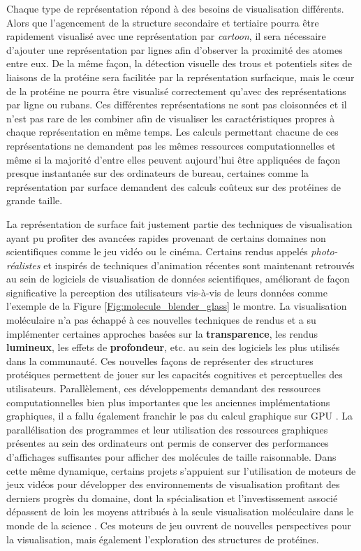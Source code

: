 Chaque type de représentation répond à des besoins de visualisation différents. Alors que l'agencement de la structure secondaire et tertiaire pourra être rapidement visualisé avec une représentation par \textit{cartoon}, il sera nécessaire d'ajouter une représentation par lignes afin d'observer la proximité des atomes entre eux. De la même façon, la détection visuelle des trous et potentiels sites de liaisons de la protéine sera facilitée par la représentation surfacique, mais le cœur de la protéine ne pourra être visualisé correctement qu'avec des représentations par ligne ou rubans. Ces différentes représentations ne sont pas cloisonnées et il n'est pas rare de les combiner afin de visualiser les caractéristiques propres à chaque représentation en même temps. Les calculs permettant chacune de ces représentations ne demandent pas les mêmes ressources computationnelles et même si la majorité d'entre elles peuvent aujourd'hui être appliquées de façon presque instantanée sur des ordinateurs de bureau, certaines comme la représentation par surface demandent des calculs coûteux sur des protéines de grande taille.

La représentation de surface fait justement partie des techniques de visualisation ayant pu profiter des avancées rapides provenant de certains domaines non scientifiques comme le jeu vidéo ou le cinéma. Certains rendus appelés \textit{photo-réalistes} et inspirés de techniques d'animation récentes sont maintenant retrouvés au sein de logiciels de visualisation de données scientifiques, améliorant de façon significative la perception des utilisateurs vis-à-vis de leurs données comme l'exemple de la Figure \ref{Fig:molecule_blender_glass} le montre. La visualisation moléculaire n'a pas échappé à ces nouvelles techniques de rendus et a su implémenter certaines approches basées sur la \textbf{transparence}, les rendus \textbf{lumineux}, les effets de \textbf{profondeur}, etc. au sein des logiciels les plus utilisés dans la communauté. Ces nouvelles façons de représenter des structures protéiques permettent de jouer sur les capacités cognitives et perceptuelles des utilisateurs. Parallèlement, ces développements demandant des ressources computationnelles bien plus importantes que les anciennes implémentations graphiques, il a fallu également franchir le pas du calcul graphique sur GPU \cite{chavent_gpu-powered_2011}. La parallélisation des programmes et leur utilisation des ressources graphiques présentes au sein des ordinateurs ont permis de conserver des performances d'affichages suffisantes pour afficher des molécules de taille raisonnable. Dans cette même dynamique, certains projets s'appuient sur l'utilisation de moteurs de jeux vidéos pour développer des environnements de visualisation profitant des derniers progrès du domaine, dont la spécialisation et l'investissement associé dépassent de loin les moyens attribués à la seule visualisation moléculaire dans le monde de la science \cite{andrei2012intuitive,lv_game_2013}. Ces moteurs de jeu ouvrent de nouvelles perspectives pour la visualisation, mais également l'exploration des structures de protéines.

